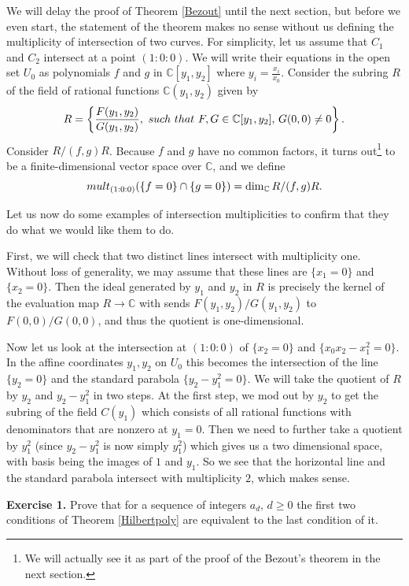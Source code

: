 \documentclass[11pt]{article}
\numberwithin{equation}{section}
\numberwithin{footnote}{section}
\newcommand{\C}{{\mathbb C}}
\begin{document}
We will delay the proof of Theorem \ref{Bezout} until the next section, but before we even start, 
the statement of the theorem makes no sense without us defining the multiplicity of intersection of two curves. For simplicity, let us assume that $C_1$ and $C_2$ intersect at a point $(1:0:0)$. We will write their equations in the open set $U_0$ as polynomials $f$ and $g$ in $\C[y_1,y_2]$ where $y_i=\frac {x_i}{x_0}$. Consider the subring $R$ of the field of rational functions $\C(y_1,y_2)$ given by
\begin{equation}\label{R}
R=\left\{\frac {F(y_1,y_2)}{G(y_1,y_2)}, {\rm ~such~that~} F,G\in \C[y_1,y_2],\,G(0,0)\neq 0\right\}.
\end{equation}
Consider $R/(f,g)R$. Because $f$ and $g$ have no common factors, it turns out\footnote{ We will actually see it as part of the proof of the Bezout's theorem in the next section.} to be a finite-dimensional vector space over $\C$, and we define
\begin{equation}\label{mult}
{\rm mult}_{(1:0:0)}(\{f=0\}\cap\{g=0\}) = \dim_\C R/(f,g)R.
\end{equation}

Let us now do some examples of intersection multiplicities to confirm that they do what we would like them to do.

\smallskip
First, we will check that two distinct lines intersect with multiplicity one. Without loss of generality, we may assume that these lines are $\{x_1=0\}$ and $\{x_2=0\}$. Then the ideal generated by $y_1$ and $y_2$ in $R$ is precisely the kernel of the evaluation map $R\to \C$ with sends $F(y_1,y_2)/G(y_1,y_2)$ to $F(0,0)/G(0,0)$, and thus the quotient is one-dimensional. 

\smallskip
Now let us look at the intersection at $(1:0:0)$ of $\{x_2=0\}$ and $\{x_0x_2-x_1^2=0\}$. In the affine coordinates $y_1,y_2$ on $U_0$ this becomes the intersection of the line $\{y_2=0\}$ and the standard parabola $\{y_2-y_1^2=0\}$. We will take the quotient of $R$ by $y_2$ and $y_2-y_1^2$ in two steps. At the first step, we mod out by $y_2$ to get the subring of the field $C(y_1)$ which consists of all rational functions with denominators that are nonzero at $y_1=0$. Then we need to further take a quotient by $y_1^2$ (since $y_2-y_1^2$ is now simply $y_1^2$) which gives us a two dimensional space, with basis being the images of $1$ and $y_1$. So we see that the horizontal line and the standard parabola intersect with multiplicity $2$, which makes sense.


\smallskip
{\bf Exercise 1.} Prove that for a sequence of integers $a_d,\,d\geq 0$ the first two conditions of Theorem \ref{Hilbertpoly} are equivalent to the last condition of it. 
\end{document}
